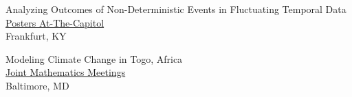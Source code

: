 Analyzing Outcomes of Non-Deterministic Events in Fluctuating Temporal Data \hfill {} \\
    \indent \quad \href{https://digitalcommons.murraystate.edu/postersatthecapitol/}{Posters At-The-Capitol} \\
    \indent \quad Frankfurt, KY

Modeling Climate Change in Togo, Africa \hfill {} \\
    \indent \quad \href{https://www.jointmathematicsmeetings.org//jmm}{Joint Mathematics Meetings} \\%
    \indent \quad Baltimore, MD

